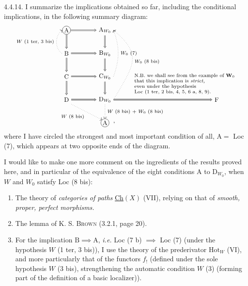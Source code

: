 \documentclass[11pt]{article}
\newcommand{\msp}[1]{\marginpar{\footnotesize [#1]}}
\begin{document}
\noindent\msp{page 63}%
4.4.14. I summarize the implications obtained so far, including the conditional implications, in the following summary diagram:
\[
\begin{tikzpicture}[baseline=(C.base),font=\small]
\node[draw,circle,inner sep=1pt] (A) at (0,0) {$\mathrm A$};
\node (AW) at (2,0) {$\mathrm A_{W_0}$};
\node (B) at (0,-1.2) {$\mathrm B$};
\node (BW) at (2,-1.2) {$\mathrm B_{W_0}$};
\node (C) at (0,-2.4) {$\mathrm C$};
\node (CW) at (2,-2.4) {$\mathrm C_{W_0}$};
\node (D) at (0,-3.6) {$\mathrm D$};
\node (DW) at (2,-3.6) {$\mathrm D_{W_0}$};
\node (F) at (7.8,-3.6) {$\mathrm F$};
\node[draw,circle,inner sep=1pt] (Ab) at (2,-4.8) {$\mathrm A$};
\node[anchor=west] at (2.25,-4.8) {$\,,$};
\foreach \p/\q in {A/AW,B/BW,C/CW,D/DW,A/B,B/C,C/D,AW/BW,BW/CW,CW/DW,DW/F}
  \draw[double,double distance=1pt,-{Implies}] (\p) -- (\q);
\draw[dotted,->] (B.west) to[out=145,in=215] node[left,font=\scriptsize] {$W$ (1 ter, 3 bis)} (A.west);
\draw[dotted,->] (CW.east) to[out=70,in=-70] node[right,font=\scriptsize] {$W_0$ (7)} (AW.east);
\draw[dotted,->] (DW.east) to[out=60,in=-40,looseness=1.45] node[right,font=\scriptsize] {$W_0$ (8 bis)} (AW.east);
\draw[dotted,->] (D.south east) -- node[below left,font=\scriptsize] {$W$ (8 bis)} (Ab.north west);
\draw[dotted,->] (DW) -- node[right,font=\scriptsize] {$W$ (8 bis) $+$ $W_0$ (8 bis)} (Ab);
\node[anchor=south west,align=left,font=\scriptsize] at (3.4,-3.45) {N.B. we shall see from the example of $\mathbf{W}_0$\\
that this implication is \textit{strict,}\\
even under the hypothesis\\
Loc (1 ter, 2 bis, 4, 5, 6 a, 8, 9).};
\end{tikzpicture}
\]
where I have circled the strongest and most important condition of all, $\mathrm{A}=$ Loc (7), which appears at two opposite ends of the diagram.

I would like to make one more comment on the ingredients of the results proved here, and in particular of the equivalence of the eight conditions A to $\mathrm{D}_{W_0}$, when $W$ and $W_0$ satisfy Loc (8 bis):

\msp{page 64}%
\begin{enumerate}[leftmargin=2.5em]
\item[1)] The theory of \textit{categories of paths} \underline{Ch}$(X)$ (VII), relying on that of \textit{smooth, proper, perfect morphisms.}
\item[2)] The lemma of K. S. \textsc{Brown} (3.2.1, page 20).
\item[3)] For the implication $\mathrm{B}\implies\mathrm{A}$, \textit{i.e.} Loc (7 b) $\implies$ Loc (7) (under the hypothesis $W$ (1 ter, 3 bis)), I use the theory of the prederivator $\mathrm{Hot}_W$ (VI), and more particularly that of the functors $f_!$ (defined under the sole hypothesis $W$ (3 bis), strengthening the automatic condition $W$ (3) (forming part of the definition of a basic localizer)).
\end{enumerate}
\end{document}
